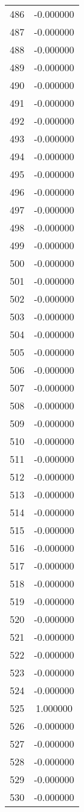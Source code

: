 \documentclass[12pt]{article}
\begin{document}
\begin{longtable}{@{}cc@{}}
486 & -0.000000 \\
487 & -0.000000 \\
488 & -0.000000 \\
489 & -0.000000 \\
490 & -0.000000 \\
491 & -0.000000 \\
492 & -0.000000 \\
493 & -0.000000 \\
494 & -0.000000 \\
495 & -0.000000 \\
496 & -0.000000 \\
497 & -0.000000 \\
498 & -0.000000 \\
499 & -0.000000 \\
500 & -0.000000 \\
501 & -0.000000 \\
502 & -0.000000 \\
503 & -0.000000 \\
504 & -0.000000 \\
505 & -0.000000 \\
506 & -0.000000 \\
507 & -0.000000 \\
508 & -0.000000 \\
509 & -0.000000 \\
510 & -0.000000 \\
511 & -0.000000 \\
512 & -0.000000 \\
513 & -0.000000 \\
514 & -0.000000 \\
515 & -0.000000 \\
516 & -0.000000 \\
517 & -0.000000 \\
518 & -0.000000 \\
519 & -0.000000 \\
520 & -0.000000 \\
521 & -0.000000 \\
522 & -0.000000 \\
523 & -0.000000 \\
524 & -0.000000 \\
525 & 1.000000 \\
526 & -0.000000 \\
527 & -0.000000 \\
528 & -0.000000 \\
529 & -0.000000 \\
530 & -0.000000 \\

\end{longtable}
\end{document}
